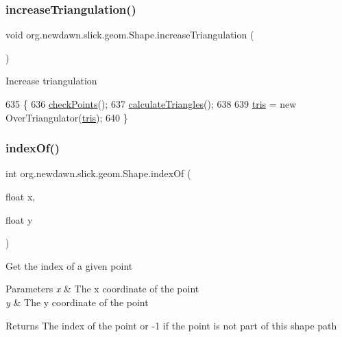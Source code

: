 \subsubsection{\texorpdfstring{increase\+Triangulation()}{increaseTriangulation()}}
{\footnotesize\ttfamily void org.\+newdawn.\+slick.\+geom.\+Shape.\+increase\+Triangulation (\begin{DoxyParamCaption}{ }\end{DoxyParamCaption})\hspace{0.3cm}{\ttfamily [inline]}}

Increase triangulation 
\begin{DoxyCode}
635                                         \{
636         \mbox{\hyperlink{classorg_1_1newdawn_1_1slick_1_1geom_1_1_shape_a84293802d05e8666a441720bfc12745d}{checkPoints}}();
637         \mbox{\hyperlink{classorg_1_1newdawn_1_1slick_1_1geom_1_1_shape_adb889f4f2a9d2838790ead72bf3df1f1}{calculateTriangles}}();
638         
639         \mbox{\hyperlink{classorg_1_1newdawn_1_1slick_1_1geom_1_1_shape_abd907aa2c7a270db435ed15ce6d090da}{tris}} = \textcolor{keyword}{new} OverTriangulator(\mbox{\hyperlink{classorg_1_1newdawn_1_1slick_1_1geom_1_1_shape_abd907aa2c7a270db435ed15ce6d090da}{tris}});
640     \}
\end{DoxyCode}
\mbox{\label{classorg_1_1newdawn_1_1slick_1_1geom_1_1_shape_a6f18bbdc7584e007a1bf7fa1b6547f5d}} 
\subsubsection{\texorpdfstring{index\+Of()}{indexOf()}}
{\footnotesize\ttfamily int org.\+newdawn.\+slick.\+geom.\+Shape.\+index\+Of (\begin{DoxyParamCaption}\item[{float}]{x,  }\item[{float}]{y }\end{DoxyParamCaption})\hspace{0.3cm}{\ttfamily [inline]}}

Get the index of a given point


\begin{DoxyParams}{Parameters}
{\em x} & The x coordinate of the point \\
\hline
{\em y} & The y coordinate of the point \\
\hline
\end{DoxyParams}
\begin{DoxyReturn}{Returns}
The index of the point or -\/1 if the point is not part of this shape path 
\end{DoxyReturn}

